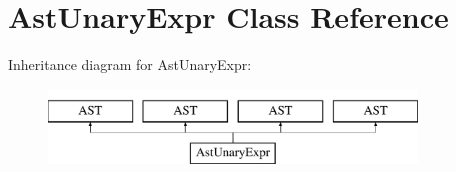 \hypertarget{classAstUnaryExpr}{\section{Ast\-Unary\-Expr Class Reference}
\label{classAstUnaryExpr}
}
Inheritance diagram for Ast\-Unary\-Expr\-:\begin{figure}[H]
\begin{center}
\leavevmode
\includegraphics[height=2.000000cm]{classAstUnaryExpr}
\end{center}
\end{figure}

